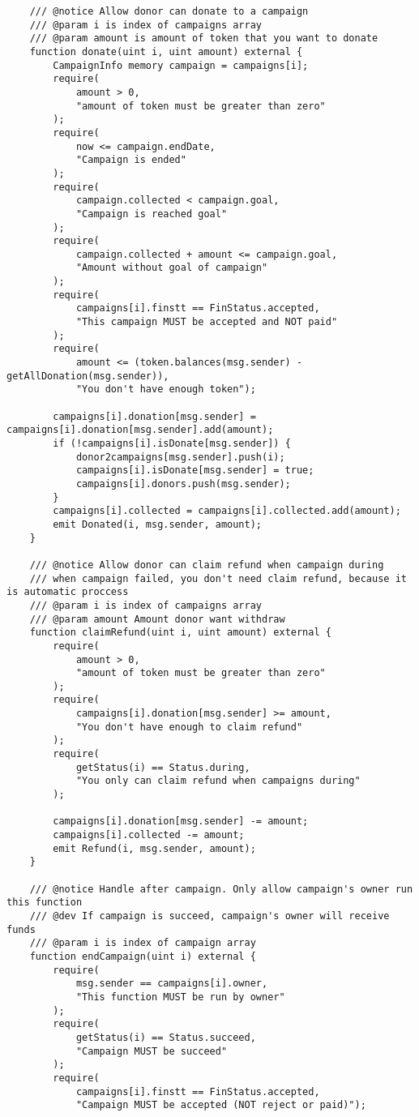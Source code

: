 \documentclass[../main-report.tex]{subfiles}
\begin{document}
\begin{lstlisting}
    /// @notice Allow donor can donate to a campaign
    /// @param i is index of campaigns array
    /// @param amount is amount of token that you want to donate
    function donate(uint i, uint amount) external {
        CampaignInfo memory campaign = campaigns[i];
        require(
            amount > 0,
            "amount of token must be greater than zero"
        );
        require(
            now <= campaign.endDate,
            "Campaign is ended"
        );
        require(
            campaign.collected < campaign.goal,
            "Campaign is reached goal"
        );
        require(
            campaign.collected + amount <= campaign.goal,
            "Amount without goal of campaign"
        );
        require(
            campaigns[i].finstt == FinStatus.accepted,
            "This campaign MUST be accepted and NOT paid"
        );
        require(
            amount <= (token.balances(msg.sender) - getAllDonation(msg.sender)),
            "You don't have enough token");

        campaigns[i].donation[msg.sender] = campaigns[i].donation[msg.sender].add(amount);
        if (!campaigns[i].isDonate[msg.sender]) {
            donor2campaigns[msg.sender].push(i);
            campaigns[i].isDonate[msg.sender] = true;
            campaigns[i].donors.push(msg.sender);
        }
        campaigns[i].collected = campaigns[i].collected.add(amount);
        emit Donated(i, msg.sender, amount);
    }

    /// @notice Allow donor can claim refund when campaign during
    /// when campaign failed, you don't need claim refund, because it is automatic proccess
    /// @param i is index of campaigns array
    /// @param amount Amount donor want withdraw
    function claimRefund(uint i, uint amount) external {
        require(
            amount > 0,
            "amount of token must be greater than zero"
        );
        require(
            campaigns[i].donation[msg.sender] >= amount,
            "You don't have enough to claim refund"
        );
        require(
            getStatus(i) == Status.during,
            "You only can claim refund when campaigns during"
        );

        campaigns[i].donation[msg.sender] -= amount;
        campaigns[i].collected -= amount;
        emit Refund(i, msg.sender, amount);
    }

    /// @notice Handle after campaign. Only allow campaign's owner run this function
    /// @dev If campaign is succeed, campaign's owner will receive funds
    /// @param i is index of campaign array
    function endCampaign(uint i) external {
        require(
            msg.sender == campaigns[i].owner,
            "This function MUST be run by owner"
        );
        require(
            getStatus(i) == Status.succeed,
            "Campaign MUST be succeed"
        );
        require(
            campaigns[i].finstt == FinStatus.accepted,
            "Campaign MUST be accepted (NOT reject or paid)");


\end{lstlisting}
\end{document}
